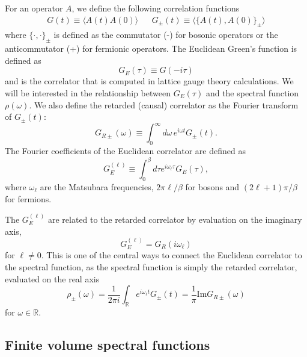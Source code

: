 For an operator $A$, we define the following correlation functions
\begin{align}
    G(t)\equiv \langle A(t) A(0) \rangle && G_\pm(t)\equiv \langle \{A(t), A(0)\}_\pm \rangle
\end{align}
where $\{\cdot, \cdot\}_\pm$ is defined as the commutator (-) for bosonic operators or the anticommutator (+) for fermionic operators. The Euclidean Green's function is defined as
\begin{equation}
    G_E(\tau) \equiv G(-i\tau)
\end{equation}
and is the correlator that is computed in lattice gauge theory calculations. We will be interested in the relationship between $G_E(\tau)$ and the spectral function $\rho(\omega)$. We also define the retarded (causal) correlator as the Fourier transform of $G_\pm(t)$:
\begin{equation}
    G_{R\pm}(\omega) \equiv \int_0^\infty d\omega\, e^{i\omega t} G_\pm(t).
\end{equation}
The Fourier coefficients of the Euclidean correlator are defined as
\begin{equation}
    G_E^{(\ell)}\equiv \int_0^\beta d\tau e^{i\omega_\ell \tau} G_E(\tau),
\end{equation}
where $\omega_\ell$ are the Matsubara frequencies, $2\pi\ell / \beta$ for bosons and $(2\ell + 1)\pi / \beta$ for fermions. 

The $G_E^{(\ell)}$ are related to the retarded correlator by evaluation on the imaginary axis,
\begin{equation}
    G_E^{(\ell)} = G_R(i\omega_\ell)
\end{equation}
for $\ell\neq 0$. This is one of the central ways to connect the Euclidean correlator to the spectral function, as the spectral function is simply the retarded correlator, evaluated on the real axis
\begin{equation}
    \rho_\pm(\omega) = \frac{1}{2\pi i} \int_{\mathbb R} e^{i\omega_\ell t} G_\pm(t) = \frac{1}{\pi} \mathrm{Im}G_{R\pm}(\omega)
    \label{eq:rho_Gr_relation}
\end{equation}
for $\omega\in\mathbb R$. 

\subsection{Finite volume spectral functions}

